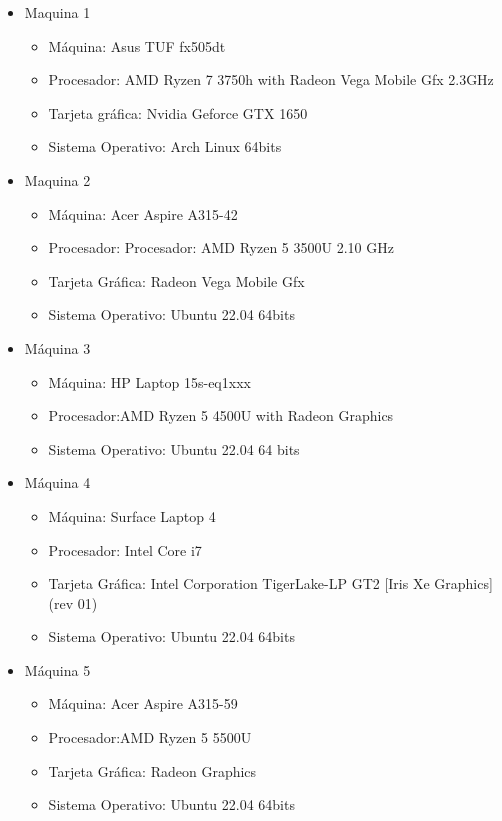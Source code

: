 \documentclass{article}
\begin{document}
    \begin{itemize}
        \item Maquina 1
        \begin{itemize}
                \item Máquina: Asus TUF fx505dt
                \item Procesador: AMD Ryzen 7 3750h with Radeon Vega Mobile Gfx 2.3GHz
                \item Tarjeta gráfica: Nvidia Geforce GTX 1650
                \item Sistema Operativo: Arch Linux 64bits
        \end{itemize}

        \item Maquina 2
        \begin{itemize}

                \item Máquina: Acer Aspire A315-42
                \item Procesador: Procesador: AMD Ryzen 5 3500U 2.10 GHz
                \item Tarjeta Gráfica: Radeon Vega Mobile Gfx
                \item Sistema Operativo: Ubuntu 22.04 64bits 
            \end{itemize}

        \item Máquina 3
            \begin{itemize}
                \item Máquina: HP Laptop 15s-eq1xxx
                \item Procesador:AMD Ryzen 5 4500U with Radeon Graphics
                \item Sistema Operativo: Ubuntu 22.04 64 bits
            \end{itemize}
        \item Máquina 4
            \begin{itemize}
                \item Máquina: Surface Laptop 4
                \item Procesador: Intel Core i7
                \item Tarjeta Gráfica: Intel Corporation TigerLake-LP GT2 [Iris Xe Graphics] (rev 01)
                \item Sistema Operativo: Ubuntu 22.04 64bits
            \end{itemize}
            
        \item Máquina 5
            \begin{itemize}
                \item Máquina: Acer Aspire A315-59 
                \item Procesador:AMD Ryzen 5 5500U 
                \item Tarjeta Gráfica:  Radeon Graphics
                \item Sistema Operativo: Ubuntu 22.04 64bits
            \end{itemize}
            

    \end{itemize}
\end{document}
